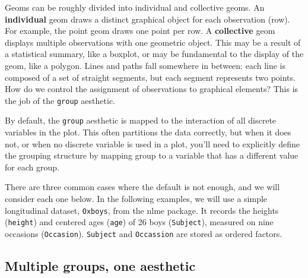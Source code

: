 Geoms can be roughly divided into individual and collective geoms. An
\textbf{individual} geom draws a distinct graphical object for each
observation (row). For example, the point geom draws one point per row.
A \textbf{collective} geom displays multiple observations with one
geometric object. This may be a result of a statistical summary, like a
boxplot, or may be fundamental to the display of the geom, like a
polygon. Lines and paths fall somewhere in between: each line is
composed of a set of straight segments, but each segment represents two
points. How do we control the assignment of observations to graphical
elements? This is the job of the \texttt{group} aesthetic.
  

By default, the \texttt{group} aesthetic is mapped to the interaction of
all discrete variables in the plot. This often partitions the data
correctly, but when it does not, or when no discrete variable is used in
a plot, you'll need to explicitly define the grouping structure by
mapping group to a variable that has a different value for each group.

There are three common cases where the default is not enough, and we
will consider each one below. In the following examples, we will use a
simple longitudinal dataset, \texttt{Oxboys}, from the nlme package. It
records the heights (\texttt{height}) and centered ages (\texttt{age})
of 26 boys (\texttt{Subject}), measured on nine occasions
(\texttt{Occasion}). \texttt{Subject} and \texttt{Occassion} are stored
as ordered factors.  

\begin{Shaded}
\begin{Highlighting}[]
 \NormalTok{)}
\end{Highlighting}
\end{Shaded}

\subsection{Multiple groups, one aesthetic}

